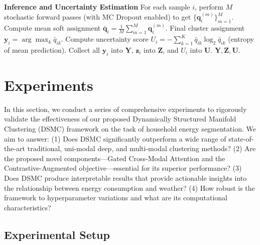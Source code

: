 \documentclass[journal]{IEEEtran}
\begin{document}
\begin{algorithm}[h!]
\begin{algorithmic}[1]
\STATE \textbf{Inference and Uncertainty Estimation}
\STATE For each sample $i$, perform $M$ stochastic forward passes (with MC Dropout enabled) to get $\{\mathbf{q}_i^{(m)}\}_{m=1}^M$.
\STATE Compute mean soft assignment $\bar{\mathbf{q}}_i = \frac{1}{M}\sum_{m=1}^M \mathbf{q}_i^{(m)}$.
\STATE Final cluster assignment $\mathbf{y}_i = \arg\max_k \bar{q}_{ik}$.
\STATE Compute uncertainty score $U_i = -\sum_{k=1}^K \bar{q}_{ik} \log_2 \bar{q}_{ik}$ (entropy of mean prediction).
\STATE Collect all $\mathbf{y}_i$ into $\mathbf{Y}$, $\mathbf{z}_i$ into $\mathbf{Z}$, and $U_i$ into $\mathbf{U}$.
\RETURN $\mathbf{Y}, \mathbf{Z}, \mathbf{U}$.
\end{algorithmic}
\end{algorithm}

\section{Experiments}
In this section, we conduct a series of comprehensive experiments to rigorously validate the effectiveness of our proposed Dynamically Structured Manifold Clustering (DSMC) framework on the task of household energy segmentation. We aim to answer: (1) Does DSMC significantly outperform a wide range of state-of-the-art traditional, uni-modal deep, and multi-modal clustering methods? (2) Are the proposed novel components—Gated Cross-Modal Attention and the Contrastive-Augmented objective—essential for its superior performance? (3) Does DSMC produce interpretable results that provide actionable insights into the relationship between energy consumption and weather? (4) How robust is the framework to hyperparameter variations and what are its computational characteristics?

\subsection{Experimental Setup}
\end{document}
